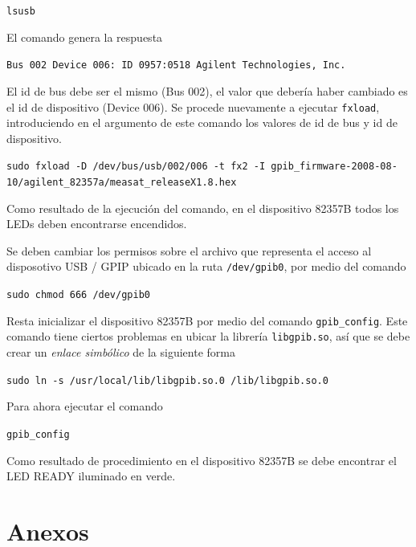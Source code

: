 \documentclass[paper=letter,oneside,fontsize=11pt]{article}
\begin{document}
		\texttt{lsusb}
		
		El comando genera la respuesta
		
		\texttt{Bus 002 Device 006: ID 0957:0518 Agilent Technologies, Inc.}
		
		El id de bus debe ser el mismo (Bus 002), el valor que debería haber cambiado es el id de dispositivo (Device 006). Se procede nuevamente a ejecutar \texttt{fxload}, introduciendo en el argumento de este comando los valores de id de bus y id de dispositivo.
		
		\texttt{sudo fxload -D /dev/bus/usb/002/006  -t fx2 -I gpib\_firmware-2008-08-10/agilent\_82357a/measat\_releaseX1.8.hex}
		
		
		Como resultado de la ejecución del comando, en el dispositivo 82357B todos los LEDs deben encontrarse encendidos.		
		
		Se deben cambiar los permisos sobre el archivo que representa el acceso al disposotivo USB / GPIP ubicado en la ruta \texttt{/dev/gpib0}, por medio del comando
		
		\texttt{sudo chmod 666 /dev/gpib0}
		
		Resta inicializar el dispositivo 82357B por medio del comando \texttt{gpib\_config}. Este comando tiene ciertos problemas en ubicar la librería \texttt{libgpib.so}, así que se debe crear un \emph{enlace simbólico} de la siguiente forma
		
		\texttt{sudo ln -s /usr/local/lib/libgpib.so.0 /lib/libgpib.so.0}
		
		Para ahora ejecutar el comando
			
		\begin{ttfamily}
			\texttt{gpib\_config}
		\end{ttfamily}

	
		Como resultado de procedimiento en el dispositivo 82357B se debe encontrar el LED READY iluminado en verde.
	
	\section{Anexos}	
		
\end{document}

